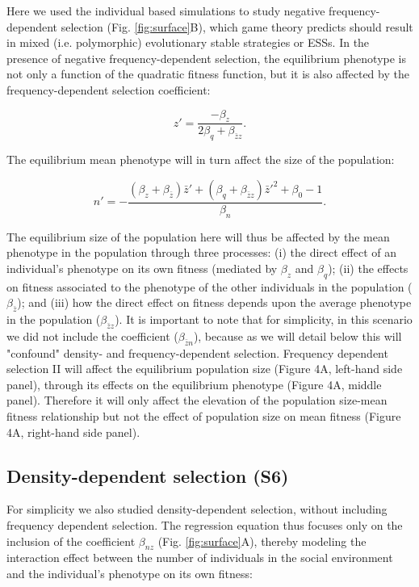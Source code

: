 \documentclass{article}
\begin{document}
\noindent Here we used the individual based simulations to study negative frequency-dependent selection (Fig. \ref{fig:surface}B), which game theory predicts should result in mixed (i.e. polymorphic) evolutionary stable strategies or ESSs. In the presence of negative frequency-dependent selection, the equilibrium phenotype is not only a function of the quadratic fitness function, but it is also affected by the frequency-dependent selection coefficient:

\begin{equation} 
z'=\frac{-\beta_{z}}{2\beta_{q} + \beta_{\bar{z}z}}.
\end{equation} 

\noindent The equilibrium mean phenotype will in turn affect the size of the population:

\begin{equation}
n' = -\frac{(\beta_{z}   + \beta_{\bar{z}})\bar{z}' + (\beta_{q} + \beta_{\bar{z}z})\bar{z}'^2+\beta_{0} -1}{\beta_{n}}.
\end{equation}

\noindent The equilibrium size of the population here will thus be affected by the mean phenotype in the population through three processes: (i) the direct effect of an individual's phenotype on its own fitness (mediated by $\beta_z$ and $ \beta_q$); (ii) the effects on fitness associated to the phenotype of the other individuals in the population ($\beta_{\bar{z}}$); and (iii) how the direct effect on fitness depends upon the average phenotype in the population ($\beta_{\bar{z}z}$). It is important to note that for simplicity, in this scenario we did not include the coefficient ($\beta_{\bar{z}n}$), because as we will detail below this will "confound" density- and frequency-dependent selection. Frequency dependent selection II will affect the equilibrium population size (Figure 4A, left-hand side panel), through its effects on the equilibrium phenotype (Figure 4A, middle panel). Therefore it will only affect the elevation of the population size-mean fitness relationship but not the effect of population size on mean fitness (Figure 4A, right-hand side panel).
 
\subsection{Density-dependent selection (S6)}
 For simplicity we also studied density-dependent selection, without including frequency dependent selection. The regression equation thus focuses only on the inclusion of the coefficient $\beta_{nz}$ (Fig. \ref{fig:surface}A), thereby modeling the interaction effect between the number of individuals in the social environment and the individual's phenotype on its own fitness:
\end{document}
